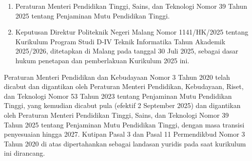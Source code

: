 \begin{enumerate}
\begin{enumerate}
  \item Berpusat pada mahasiswa: capaian pembelajaran lulusan diraih melalui proses pembelajaran yang mengutamakan pengembangan kreativitas, kapasitas, kepribadian, dan kebutuhan mahasiswa, serta mengembangkan kemandirian dalam mencari dan menemukan pengetahuan.
  \end{enumerate}
\item Peraturan Menteri Pendidikan Tinggi, Sains, dan Teknologi Nomor 39 Tahun 2025 tentang Penjaminan Mutu Pendidikan Tinggi.
\item Keputusan Direktur Politeknik Negeri Malang Nomor 1141/HK/2025 tentang Kurikulum Program Studi D-IV Teknik Informatika Tahun Akademik 2025/2026, ditetapkan di Malang pada tanggal 30 Juli 2025, sebagai dasar hukum penetapan dan pemberlakuan Kurikulum 2025 ini.
\end{enumerate}

Peraturan Menteri Pendidikan dan Kebudayaan Nomor 3 Tahun 2020 telah dicabut dan digantikan oleh Peraturan Menteri Pendidikan, Kebudayaan, Riset, dan Teknologi Nomor 53 Tahun 2023 tentang Penjaminan Mutu Pendidikan Tinggi, yang kemudian dicabut pula (efektif 2 September 2025) dan digantikan oleh Peraturan Menteri Pendidikan Tinggi, Sains, dan Teknologi Nomor 39 Tahun 2025 tentang Penjaminan Mutu Pendidikan Tinggi, dengan masa transisi penyesuaian hingga 2027. Kutipan Pasal 3 dan Pasal 11 Permendikbud Nomor 3 Tahun 2020 di atas dipertahankan sebagai landasan yuridis pada saat kurikulum ini dirancang.
